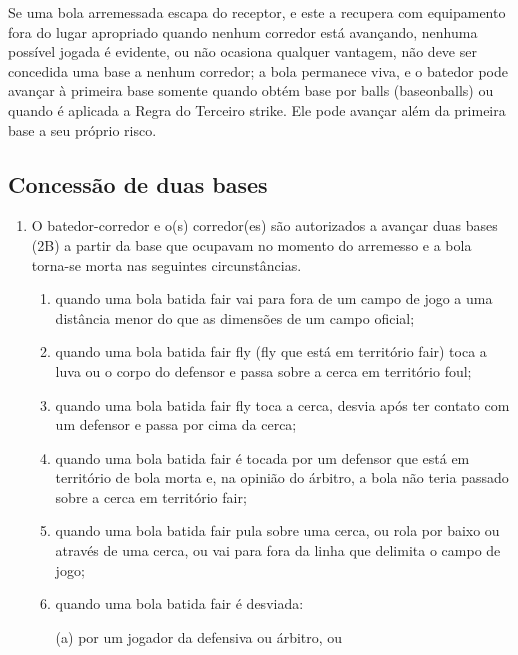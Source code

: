 \begin{enumerate}[label=\roman*.]
\begin{enumerate}[label=\arabic*)]
		Se uma bola arremessada escapa do receptor, e este a recupera com equipamento fora do lugar apropriado quando nenhum corredor está avançando, nenhuma possível jogada é evidente, ou não ocasiona qualquer vantagem, não deve ser concedida uma base a nenhum corredor; a bola permanece viva, e o batedor pode avançar à primeira base somente quando obtém base por \glspl{ball} (\gls{baseonballs}) ou quando é aplicada a Regra do Terceiro \gls{strike}. Ele pode avançar além da primeira base a seu próprio risco.
	\end{enumerate}

	\subsection{Concessão de duas bases}

	\begin{enumerate}[label=\roman*.]
		\item O batedor-corredor e o(s) corredor(es) são autorizados a avançar duas bases (\gls{2B}) a partir da base que ocupavam no momento do arremesso e a bola torna-se morta nas seguintes circunstâncias.

		\begin{enumerate}[label=\arabic*)]
			\item quando uma bola batida \gls{fair} vai para fora de um campo de jogo a uma  distância menor do que as dimensões de um campo oficial;
			\item  quando uma bola batida \gls{fair fly} (\gls{fly} que está em território \gls{fair}) toca a luva ou o corpo do defensor e passa sobre a cerca em território \gls{foul};
			\item  quando uma bola batida \gls{fair fly} toca a cerca, desvia após ter contato com  um defensor e passa por cima da cerca;
			\item  quando uma bola batida \gls{fair} é tocada por um defensor que está em território de bola morta e, na opinião do árbitro, a bola não teria passado sobre a cerca em território \gls{fair};
			\item  quando uma bola batida \gls{fair} pula sobre uma cerca, ou rola por baixo ou através de uma cerca, ou vai para fora da linha que delimita o campo de jogo;
			\item  quando uma bola batida \gls{fair} é desviada:

			(a) por um jogador da defensiva ou árbitro, ou


\end{enumerate}
\end{enumerate}
\end{enumerate}
